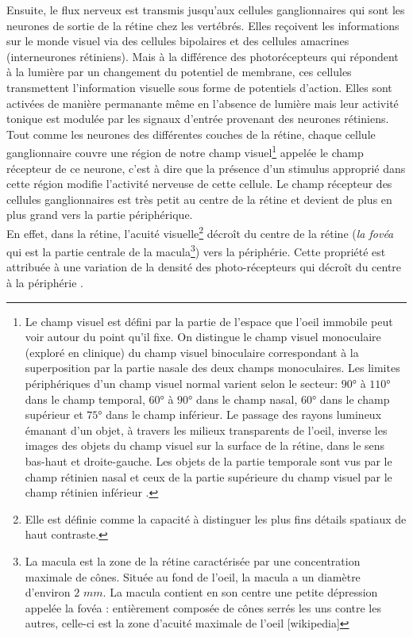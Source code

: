 Ensuite, le flux nerveux est transmis jusqu'aux cellules ganglionnaires qui sont les neurones de sortie de la rétine chez les vertébrés. Elles reçoivent les informations sur le monde visuel via des cellules bipolaires et des cellules amacrines (interneurones rétiniens). Mais à la différence des photorécepteurs qui répondent à la lumière par un changement du potentiel de membrane, ces cellules transmettent l'information visuelle sous forme de potentiels d'action. Elles sont activées de manière permanante même en l'absence de lumière mais leur activité tonique est modulée par les signaux d'entrée provenant des neurones rétiniens. Tout comme les neurones des différentes couches de la rétine, chaque cellule ganglionnaire couvre une région de notre champ visuel\footnote{Le champ visuel est défini par la partie de l'espace que l'oeil immobile peut voir autour du point qu'il fixe. On distingue le champ visuel monoculaire (exploré en clinique) du champ visuel binoculaire correspondant à la superposition par la partie nasale des deux champs monoculaires. Les limites périphériques d'un champ visuel normal varient selon le secteur: $90°$ à $110°$ dans le champ temporal, $60°$ à $90°$ dans le champ nasal, $60°$ dans le champ supérieur et $75°$ dans le champ inférieur. Le passage des rayons lumineux émanant d'un objet, à travers les milieux transparents de l'oeil, inverse les images des objets du champ visuel sur la surface de la rétine, dans le sens bas-haut et droite-gauche. Les objets de la partie temporale sont vus par le champ rétinien nasal et ceux de la partie supérieure du champ visuel par le champ rétinien inférieur \cite{Flament:2002}.} appelée le champ récepteur de ce neurone, c'est à dire que la présence d'un stimulus approprié dans cette région modifie l'activité nerveuse de cette cellule. Le champ récepteur des cellules ganglionnaires est très petit au centre de la rétine et devient de plus en plus grand vers la partie périphérique.\\

En effet, dans la rétine, l'acuité visuelle\footnote{Elle est définie comme la capacité à distinguer les plus fins détails spatiaux de haut contraste.} décroît du centre de la rétine (\textit{la fovéa} qui est la partie centrale de la macula\footnote{La macula est la zone de la rétine caractérisée par une concentration maximale de cônes. Située au fond de l'oeil, la macula a un diamètre d'environ $2$ $mm$. La macula contient en son centre une petite dépression appelée la fovéa : entièrement composée de cônes serrés les uns contre les autres, celle-ci est la zone d'acuité maximale de l'oeil [wikipedia]}) vers la périphérie. Cette propriété est attribuée à une variation de la densité des photo-récepteurs qui décroît du centre à la périphérie \cite{Marilly:1999}. 

